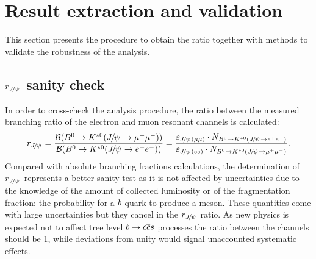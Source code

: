 \section{Result extraction and validation}
\label{sec:RKst_result}

This section presents the procedure to obtain the \RKst ratio together with
methods to validate the robustness of the analysis.


\subsection{$r_{\jpsi}$ sanity check}
\label{sec:Rjpsi}

In order to cross-check the analysis procedure, the ratio between the
measured branching ratio of the electron and muon resonant channels is calculated:
%
\begin{equation}
r_{\jpsi} = \frac{\BR(\Bz\to\Kstarz(\jpsi\to \mumu))} {\BR(\Bz\to\Kstarz(\jpsi\to \epem))} 
= \frac{\varepsilon_{\jpsi(\mu\mu)} \cdot N_{\Bz\to\Kstarz(\jpsi\to \epem)}}{\varepsilon_{\jpsi(ee)} 
\cdot N_{\Bz\to\Kstarz(\jpsi\to \mumu)}}.
\end{equation}
%
Compared with absolute branching fractions calculations, the determination of $r_{\jpsi}$ represents a better
sanity test as it is not affected by uncertainties due to the knowledge of the amount of collected 
luminosity or of the fragmentation fraction: the probability for a ${b}$
quark to produce a \Bz meson. These quantities come with large uncertainties but they cancel
in the $r_{\jpsi}$ ratio. As new physics is expected not to affect tree level $b\rightarrow{\ensuremath{c}}{\ensuremath{\overline {{c}}}}{\ensuremath{s}}$ 
processes the ratio between the \jpsi channels should be 1, while deviations from unity would signal
unaccounted systematic effects.

%
%



